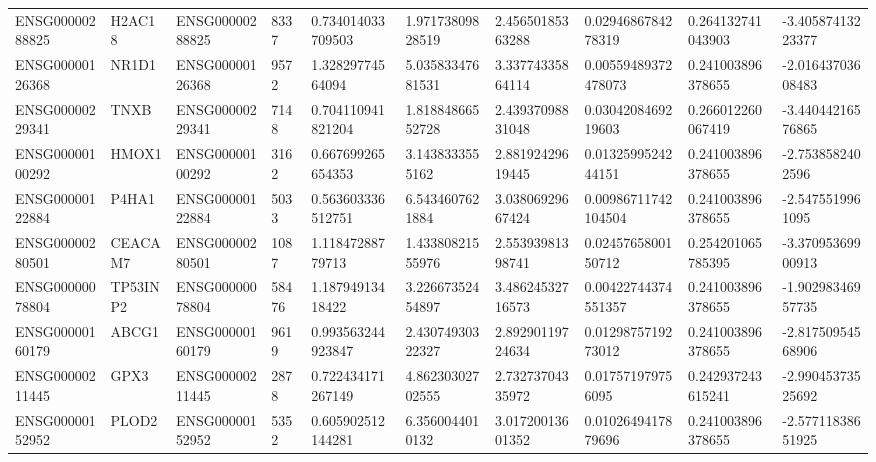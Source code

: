\begin{tabular}{@{}llllllllll@{}}
ENSG00000288825 & H2AC18 & ENSG00000288825 & 8337 & 0.734014033709503 & 1.97173809828519 & 2.45650185363288 & 0.0294686784278319 & 0.264132741043903 & -3.40587413223377 \\
ENSG00000126368 & NR1D1 & ENSG00000126368 & 9572 & 1.32829774564094 & 5.03583347681531 & 3.33774335864114 & 0.00559489372478073 & 0.241003896378655 & -2.01643703608483 \\
ENSG00000229341 & TNXB & ENSG00000229341 & 7148 & 0.704110941821204 & 1.81884866552728 & 2.43937098831048 & 0.0304208469219603 & 0.266012260067419 & -3.44044216576865 \\
ENSG00000100292 & HMOX1 & ENSG00000100292 & 3162 & 0.667699265654353 & 3.1438333555162 & 2.88192429619445 & 0.0132599524244151 & 0.241003896378655 & -2.7538582402596 \\
ENSG00000122884 & P4HA1 & ENSG00000122884 & 5033 & 0.563603336512751 & 6.5434607621884 & 3.03806929667424 & 0.00986711742104504 & 0.241003896378655 & -2.5475519961095 \\
ENSG00000280501 & CEACAM7 & ENSG00000280501 & 1087 & 1.11847288779713 & 1.43380821555976 & 2.55393981398741 & 0.0245765800150712 & 0.254201065785395 & -3.37095369900913 \\
ENSG00000078804 & TP53INP2 & ENSG00000078804 & 58476 & 1.18794913418422 & 3.22667352454897 & 3.48624532716573 & 0.00422744374551357 & 0.241003896378655 & -1.90298346957735 \\
ENSG00000160179 & ABCG1 & ENSG00000160179 & 9619 & 0.993563244923847 & 2.43074930322327 & 2.89290119724634 & 0.0129875719273012 & 0.241003896378655 & -2.81750954568906 \\
ENSG00000211445 & GPX3 & ENSG00000211445 & 2878 & 0.722434171267149 & 4.86230302702555 & 2.73273704335972 & 0.017571979756095 & 0.242937243615241 & -2.99045373525692 \\
ENSG00000152952 & PLOD2 & ENSG00000152952 & 5352 & 0.605902512144281 & 6.3560044010132 & 3.01720013601352 & 0.0102649417879696 & 0.241003896378655 & -2.57711838651925 \\
\bottomrule
\end{tabular}
\endgroup
